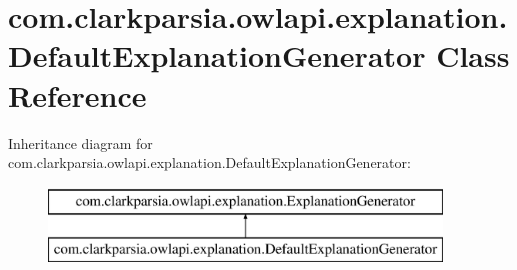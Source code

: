 \hypertarget{classcom_1_1clarkparsia_1_1owlapi_1_1explanation_1_1_default_explanation_generator}{\section{com.\-clarkparsia.\-owlapi.\-explanation.\-Default\-Explanation\-Generator Class Reference}
\label{classcom_1_1clarkparsia_1_1owlapi_1_1explanation_1_1_default_explanation_generator}
}
Inheritance diagram for com.\-clarkparsia.\-owlapi.\-explanation.\-Default\-Explanation\-Generator\-:\begin{figure}[H]
\begin{center}
\leavevmode
\includegraphics[height=2.000000cm]{classcom_1_1clarkparsia_1_1owlapi_1_1explanation_1_1_default_explanation_generator}
\end{center}
\end{figure}
